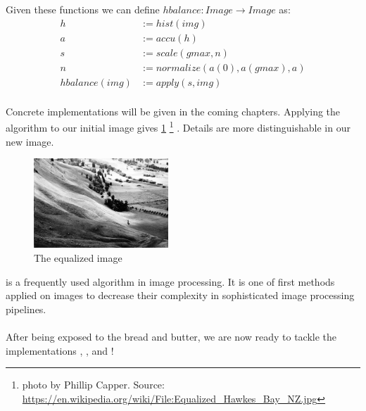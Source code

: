       Given these functions we can define $hbalance: Image \rightarrow Image$ as:
      \begin{equation*}
      \begin{split}
          h & := hist(img) \\
          a & := accu(h) \\
          s & := scale(gmax,n) \\
          n & := normalize(a(0), a(gmax), a) \\
        hbalance(img) & := apply(s,img) \\
      \end{split}
      \end{equation*}
      
      Concrete implementations will be given in the coming chapters.
      Applying the algorithm to our initial image gives \ref{fig:img-eq}
      \footnote{photo by Phillip Capper. Source: \url{https://en.wikipedia.org/wiki/File:Equalized_Hawkes_Bay_NZ.jpg}}
      . Details are more distinguishable in our new image.
      
      \begin{figure}[h]
        \centering
        \includegraphics[width=0.45\textwidth]{img-eq}
        \caption{The equalized image}
        \label{fig:img-eq}
      \end{figure}
    
  \algo{} is a frequently used algorithm in image processing. It is 
  one of first methods applied on images to decrease their complexity
  in sophisticated image processing pipelines.
  
  \paragraph{}
  After being exposed to the bread and butter, we are now ready to tackle the
  implementations \seq, \man, \ndpn and \ndpv!
  
    
